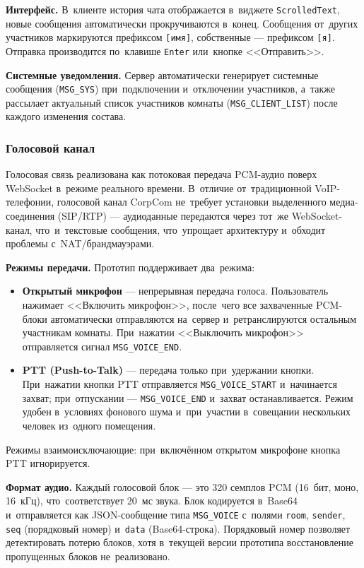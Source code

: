 \textbf{Интерфейс.} В~клиенте история чата отображается в~виджете \texttt{ScrolledText}, новые сообщения автоматически прокручиваются в~конец. Сообщения от~других участников маркируются префиксом \texttt{[имя]}, собственные --- префиксом \texttt{[я]}. Отправка производится по~клавише \texttt{Enter} или~кнопке <<Отправить>>.

\textbf{Системные уведомления.} Сервер автоматически генерирует системные сообщения (\texttt{MSG\_SYS}) при~подключении и~отключении участников, а~также рассылает актуальный список участников комнаты (\texttt{MSG\_CLIENT\_LIST}) после каждого изменения состава.

\subsubsection{Голосовой канал}

Голосовая связь реализована как потоковая передача PCM-аудио поверх WebSocket в~режиме реального времени. В~отличие от~традиционной VoIP-телефонии, голосовой канал CorpCom не~требует установки выделенного медиа-соединения (SIP/RTP) --- аудиоданные передаются через тот~же WebSocket-канал, что~и~текстовые сообщения, что~упрощает архитектуру и~обходит проблемы с~NAT/брандмауэрами.

\textbf{Режимы передачи.} Прототип поддерживает два~режима:

\begin{itemize}
  \item \textbf{Открытый микрофон} --- непрерывная передача голоса. Пользователь нажимает <<Включить микрофон>>, после~чего все захваченные PCM-блоки автоматически отправляются на~сервер и~ретранслируются остальным участникам комнаты. При~нажатии <<Выключить микрофон>> отправляется сигнал \texttt{MSG\_VOICE\_END}.
  \item \textbf{PTT (Push-to-Talk)} --- передача только при~удержании кнопки. При~нажатии кнопки PTT отправляется \texttt{MSG\_VOICE\_START} и~начинается захват; при~отпускании --- \texttt{MSG\_VOICE\_END} и~захват останавливается. Режим удобен в~условиях фонового шума и~при~участии в~совещании нескольких человек из~одного помещения.
\end{itemize}

Режимы взаимоисключающие: при~включённом открытом микрофоне кнопка PTT игнорируется.

\textbf{Формат аудио.} Каждый голосовой блок --- это 320 семплов PCM (16~бит, моно, 16~кГц), что~соответствует 20~мс звука. Блок кодируется в~Base64 и~отправляется как JSON-сообщение типа \texttt{MSG\_VOICE} с~полями \texttt{room}, \texttt{sender}, \texttt{seq} (порядковый номер) и~\texttt{data} (Base64-строка). Порядковый номер позволяет детектировать потерю блоков, хотя в~текущей версии прототипа восстановление пропущенных блоков не~реализовано.

